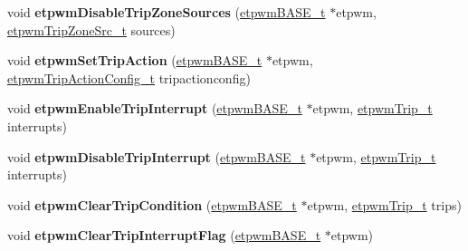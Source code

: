 \begin{DoxyCompactItemize}
\item 
\mbox{\label{group__ePWM_ga0597a018010e26b0d97b4567022dce8c}} 
void {\bfseries etpwm\+Disable\+Trip\+Zone\+Sources} (\mbox{\hyperlink{reg__etpwm_8h_a3030c3a8f18ffd60ee3de5bbd7632891}{etpwm\+B\+A\+S\+E\+\_\+t}} $\ast$etpwm, \mbox{\hyperlink{etpwm_8h_a61fc897f82f511a0da2493cd1629cc83}{etpwm\+Trip\+Zone\+Src\+\_\+t}} sources)
\item 
\mbox{\label{group__ePWM_gaac0e113d3ca65c4ca89571eeb03d7e45}} 
void {\bfseries etpwm\+Set\+Trip\+Action} (\mbox{\hyperlink{reg__etpwm_8h_a3030c3a8f18ffd60ee3de5bbd7632891}{etpwm\+B\+A\+S\+E\+\_\+t}} $\ast$etpwm, \mbox{\hyperlink{structetpwmTripActionConfig__t}{etpwm\+Trip\+Action\+Config\+\_\+t}} tripactionconfig)
\item 
\mbox{\label{group__ePWM_gad7dc33abc7f2ec6a36418934ec40b663}} 
void {\bfseries etpwm\+Enable\+Trip\+Interrupt} (\mbox{\hyperlink{reg__etpwm_8h_a3030c3a8f18ffd60ee3de5bbd7632891}{etpwm\+B\+A\+S\+E\+\_\+t}} $\ast$etpwm, \mbox{\hyperlink{etpwm_8h_a1d25b4cd16ce2c7ee79696b690abb2fd}{etpwm\+Trip\+\_\+t}} interrupts)
\item 
\mbox{\label{group__ePWM_gabee3e7c9d1e1b4096eb7ceb392684027}} 
void {\bfseries etpwm\+Disable\+Trip\+Interrupt} (\mbox{\hyperlink{reg__etpwm_8h_a3030c3a8f18ffd60ee3de5bbd7632891}{etpwm\+B\+A\+S\+E\+\_\+t}} $\ast$etpwm, \mbox{\hyperlink{etpwm_8h_a1d25b4cd16ce2c7ee79696b690abb2fd}{etpwm\+Trip\+\_\+t}} interrupts)
\item 
\mbox{\label{group__ePWM_gabfc809561801a2def8255c50157d687f}} 
void {\bfseries etpwm\+Clear\+Trip\+Condition} (\mbox{\hyperlink{reg__etpwm_8h_a3030c3a8f18ffd60ee3de5bbd7632891}{etpwm\+B\+A\+S\+E\+\_\+t}} $\ast$etpwm, \mbox{\hyperlink{etpwm_8h_a1d25b4cd16ce2c7ee79696b690abb2fd}{etpwm\+Trip\+\_\+t}} trips)
\item 
\mbox{\label{group__ePWM_ga5fe6ddb6cb8ab2df23a6a70f18e41daa}} 
void {\bfseries etpwm\+Clear\+Trip\+Interrupt\+Flag} (\mbox{\hyperlink{reg__etpwm_8h_a3030c3a8f18ffd60ee3de5bbd7632891}{etpwm\+B\+A\+S\+E\+\_\+t}} $\ast$etpwm)
\item 
\mbox{\label{group__ePWM_gade14d3b50bbeaf0bec5ccf12056b8ef5}} 

\end{DoxyCompactItemize}
